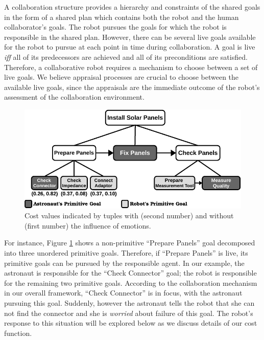 \documentclass[12pt]{report}
\begin{document}
A collaboration structure provides a hierarchy and constraints of the shared
goals in the form of a shared plan which contains both the robot and the human
collaborator's goals. The robot pursues the goals for which the robot is
responsible in the shared plan. However, there can be several live goals
available for the robot to pursue at each point in time during collaboration. A
goal is live \textit{iff} all of its predecessors are achieved and all of its
preconditions are satisfied. Therefore, a collaborative robot requires a
mechanism to choose between a set of live goals. We believe appraisal processes
are crucial to choose between the available live goals, since the appraisals are
the immediate outcome of the robot's assessment of the collaboration environment.

\begin{figure}[tbh]
  \centering
  \includegraphics[width=1\textwidth]{figure/goal_management_collaboration_structure-croped.pdf}
  \caption{Cost values indicated by tuples with (second number) and without
  (first number) the influence of emotions.}
  \label{fig:task-model-astronaut}
\end{figure}

For instance, Figure \ref{fig:task-model-astronaut} shows a non-primitive
``Prepare Panels'' goal decomposed into three unordered primitive goals.
Therefore, if ``Prepare Panels'' is live, its primitive goals can be pursued by
the responsible agent. In our example, the astronaut is responsible for the
``Check Connector'' goal; the robot is responsible for the remaining two
primitive goals. According to the collaboration mechanism in our overall
framework, ``Check Connector'' is in focus, with the astronaut pursuing this
goal. Suddenly, however the astronaut tells the robot that she can not find the
connector and she is \textit{worried} about failure of this goal. The robot's
response to this situation will be explored below as we discuss details of our
cost function.
\end{document}

